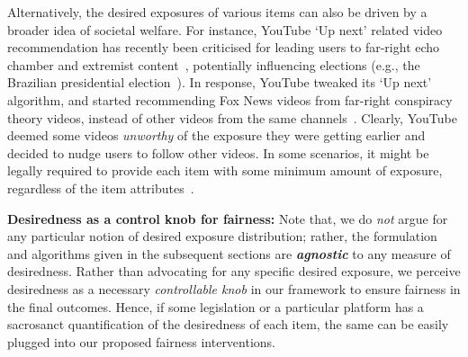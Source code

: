 Alternatively, the desired exposures of various items can also be driven by a broader idea of societal welfare. %
For instance, YouTube `Up next' related video recommendation has recently been criticised for leading users to far-right echo chamber and extremist content~\cite{youtubeRadical}, potentially influencing elections (e.g., the Brazilian presidential election~\cite{youtubeBrazil}). In response, YouTube tweaked its `Up next' algorithm, and started recommending Fox News videos from far-right conspiracy theory videos, instead of other videos from the same channels~\cite{youtubeFoxnews}. Clearly, YouTube deemed some videos {\it unworthy} of the exposure they were getting earlier and decided to nudge users to follow other videos. 
In some scenarios, %
it might be legally required to provide each item with some minimum amount of exposure, regardless of the item attributes~\cite{patro2020incremental,patro2020fairrec}. 


\vspace{1 mm}
\noindent
\textbf{Desiredness as a control knob for fairness: }Note that, we do {\it not} argue for any particular notion of desired exposure distribution; rather, the formulation and algorithms given in the subsequent sections are \textit{\textbf{agnostic}} to any measure of desiredness. 
Rather than advocating for any specific desired exposure, we perceive desiredness as a necessary {\it controllable knob} in our framework to ensure fairness in the final outcomes. 
Hence, if some legislation or a particular platform has a sacrosanct quantification of the desiredness of each item, the same can be easily plugged into our proposed fairness interventions.

\vspace{-2mm}
